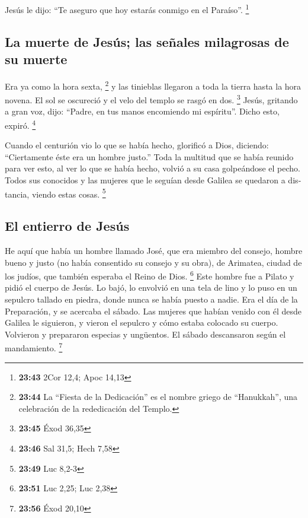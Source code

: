 \begin{paracol}{2}
\begin{otherlanguage}{english}
 Jesús le dijo: ``Te aseguro que hoy estarás conmigo en
el Paraíso''. \footnote{\textbf{23:43} 2Cor 12,4; Apoc 14,13}

\hypertarget{la-muerte-de-jesuxfas-las-seuxf1ales-milagrosas-de-su-muerte}{%
\subsection{La muerte de Jesús; las señales milagrosas de su
muerte}\label{la-muerte-de-jesuxfas-las-seuxf1ales-milagrosas-de-su-muerte}}

 Era ya como la hora sexta, \footnote{\textbf{23:44} La
  ``Fiesta de la Dedicación'' es el nombre griego de ``Hanukkah'', una
  celebración de la rededicación del Templo.} y las tinieblas llegaron a
toda la tierra hasta la hora novena.  El sol se oscureció
y el velo del templo se rasgó en dos. \footnote{\textbf{23:45} Éxod
  36,35}  Jesús, gritando a gran voz, dijo: ``Padre, en
tus manos encomiendo mi espíritu''. Dicho esto, expiró. \footnote{\textbf{23:46}
  Sal 31,5; Hech 7,58}

 Cuando el centurión vio lo que se había hecho, glorificó
a Dios, diciendo: ``Ciertamente éste era un hombre justo.''
 Toda la multitud que se había reunido para ver esto, al
ver lo que se había hecho, volvió a su casa golpeándose el pecho.
 Todos sus conocidos y las mujeres que le seguían desde
Galilea se quedaron a distancia, viendo estas cosas. \footnote{\textbf{23:49}
  Luc 8,2-3}

\hypertarget{el-entierro-de-jesuxfas}{%
\subsection{El entierro de Jesús}\label{el-entierro-de-jesuxfas}}

 He aquí que había un hombre llamado José, que era
miembro del consejo, hombre bueno y justo  (no había
consentido su consejo y su obra), de Arimatea, ciudad de los judíos, que
también esperaba el Reino de Dios. \footnote{\textbf{23:51} Luc 2,25;
  Luc 2,38}  Este hombre fue a Pilato y pidió el cuerpo
de Jesús.  Lo bajó, lo envolvió en una tela de lino y lo
puso en un sepulcro tallado en piedra, donde nunca se había puesto a
nadie.  Era el día de la Preparación, y se acercaba el
sábado.  Las mujeres que habían venido con él desde
Galilea le siguieron, y vieron el sepulcro y cómo estaba colocado su
cuerpo.  Volvieron y prepararon especias y ungüentos. El
sábado descansaron según el mandamiento. \footnote{\textbf{23:56} Éxod
  20,10}


\end{otherlanguage}
\end{paracol}
